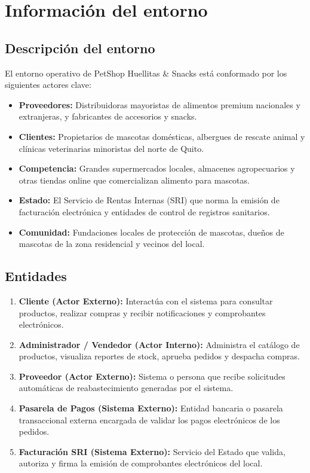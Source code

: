 \documentclass[11pt,a4paper]{article}
\begin{document}
\section{Información del entorno}

\subsection{Descripción del entorno}
El entorno operativo de PetShop Huellitas \& Snacks está conformado por los siguientes actores clave:
\begin{itemize}
    \item \textbf{Proveedores:} Distribuidoras mayoristas de alimentos premium nacionales y extranjeras, y fabricantes de accesorios y snacks.
    \item \textbf{Clientes:} Propietarios de mascotas domésticas, albergues de rescate animal y clínicas veterinarias minoristas del norte de Quito.
    \item \textbf{Competencia:} Grandes supermercados locales, almacenes agropecuarios y otras tiendas online que comercializan alimento para mascotas.
    \item \textbf{Estado:} El Servicio de Rentas Internas (SRI) que norma la emisión de facturación electrónica y entidades de control de registros sanitarios.
    \item \textbf{Comunidad:} Fundaciones locales de protección de mascotas, dueños de mascotas de la zona residencial y vecinos del local.
\end{itemize}

\subsection{Entidades}
\begin{enumerate}
    \item \textbf{Cliente (Actor Externo):} Interactúa con el sistema para consultar productos, realizar compras y recibir notificaciones y comprobantes electrónicos.
    \item \textbf{Administrador / Vendedor (Actor Interno):} Administra el catálogo de productos, visualiza reportes de stock, aprueba pedidos y despacha compras.
    \item \textbf{Proveedor (Actor Externo):} Sistema o persona que recibe solicitudes automáticas de reabastecimiento generadas por el sistema.
    \item \textbf{Pasarela de Pagos (Sistema Externo):} Entidad bancaria o pasarela transaccional externa encargada de validar los pagos electrónicos de los pedidos.
    \item \textbf{Facturación SRI (Sistema Externo):} Servicio del Estado que valida, autoriza y firma la emisión de comprobantes electrónicos del local.
\end{enumerate}
\end{document}
